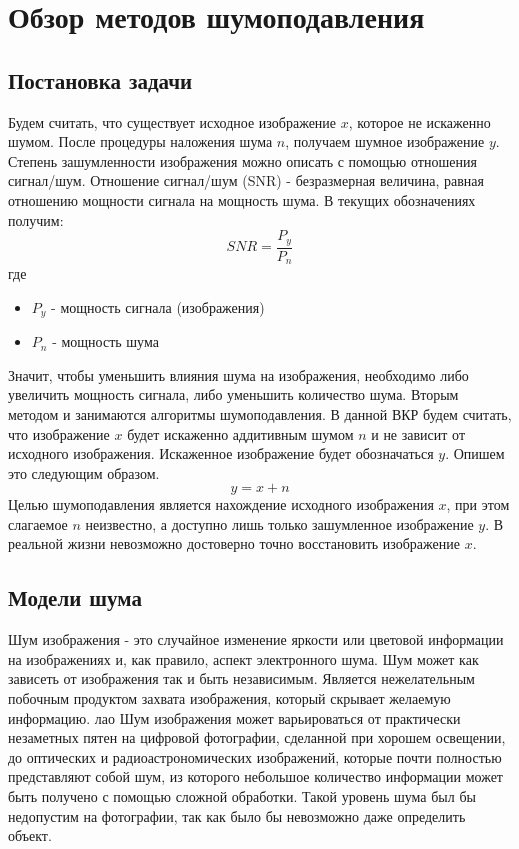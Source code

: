 \section{Обзор методов шумоподавления}
\subsection{Постановка задачи}
Будем считать, что существует исходное изображение $x$, которое не искаженно шумом. После процедуры наложения шума $n$, получаем шумное изображение $y$. Степень зашумленности изображения можно описать с помощью отношения сигнал/шум.
 Отношение сигнал/шум (SNR) - безразмерная величина, равная отношению мощности сигнала на мощность шума. В текущих обозначениях получим:
\begin{equation}
	SNR = \frac{P_y}{P_n}
\end{equation} 
где
\begin{itemize}
	\item $P_y$ - мощность сигнала (изображения)
	\item $P_n$ - мощность шума
\end{itemize}

Значит, чтобы уменьшить влияния шума на изображения, необходимо либо увеличить мощность сигнала, либо уменьшить количество шума. Вторым методом и занимаются алгоритмы шумоподавления.
В данной ВКР будем считать, что изображение $x$ будет искаженно аддитивным шумом $n$ и не зависит от исходного изображения. Искаженное изображение будет обозначаться $y$. Опишем это следующим образом.
\begin{equation}
	y = x + n
\end{equation}
Целью шумоподавления является нахождение исходного изображения $x$, при этом слагаемое $n$ неизвестно, а доступно лишь только зашумленное изображение $y$. В реальной жизни невозможно достоверно точно восстановить изображение $x$.



\subsection{Модели шума}
Шум изображения - это случайное изменение яркости или цветовой информации на изображениях и, как правило, аспект электронного шума. Шум может как зависеть от изображения так и быть независимым. Является нежелательным побочным продуктом захвата изображения, который скрывает желаемую информацию.
лао
Шум изображения может варьироваться от практически незаметных пятен на цифровой фотографии, сделанной при хорошем освещении, до оптических и радиоастрономических изображений, которые почти полностью представляют собой шум, из которого небольшое количество информации может быть получено с помощью сложной обработки. Такой уровень шума был бы недопустим на фотографии, так как было бы невозможно даже определить объект\cite{Noise}.

